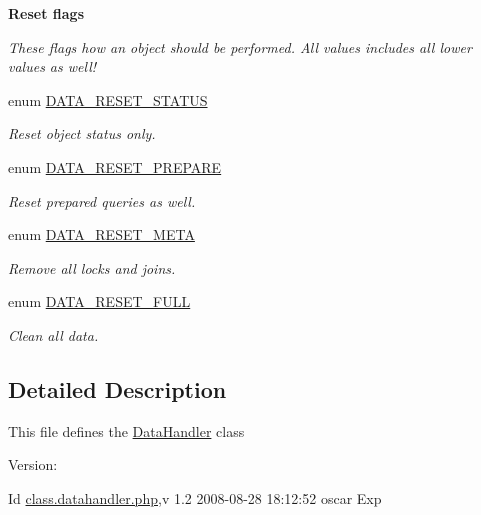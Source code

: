 \begin{Indent}{\bf Reset flags}\par
{\em These flags how an object should be performed. All values includes all lower values as well! }\begin{CompactItemize}
\item 
enum \hyperlink{class_8datahandler_8php_9266811d651cb3ff8c5fdf00111e677b}{DATA\_\-RESET\_\-STATUS} 
\begin{CompactList}\small\item\em Reset object status only. \item\end{CompactList}\item 
enum \hyperlink{class_8datahandler_8php_19a99423705b41e563424ae76d7fe184}{DATA\_\-RESET\_\-PREPARE} 
\begin{CompactList}\small\item\em Reset prepared queries as well. \item\end{CompactList}\item 
enum \hyperlink{class_8datahandler_8php_3ce9f928f9ba75096925bd4157246bbb}{DATA\_\-RESET\_\-META} 
\begin{CompactList}\small\item\em Remove all locks and joins. \item\end{CompactList}\item 
enum \hyperlink{class_8datahandler_8php_2a28429433990da242faa223d5a49f0a}{DATA\_\-RESET\_\-FULL} 
\begin{CompactList}\small\item\em Clean all data. \item\end{CompactList}\end{CompactItemize}
\end{Indent}


\subsection{Detailed Description}
This file defines the \hyperlink{classDataHandler}{DataHandler} class \begin{Desc}
\item[Version:]\end{Desc}
\begin{Desc}
\item[Id]\hyperlink{class_8datahandler_8php}{class.datahandler.php},v 1.2 2008-08-28 18:12:52 oscar Exp \end{Desc}


